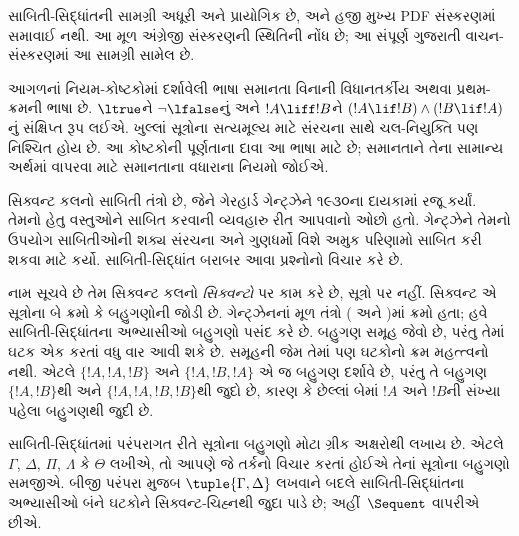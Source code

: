 
\label{guunit:OLP-0685}


\begin{editorial}
  સાબિતી-સિદ્ધાંતની સામગ્રી અધૂરી અને પ્રાયોગિક છે,
  અને હજી મુખ્ય PDF સંસ્કરણમાં સમાવાઈ નથી.
  આ મૂળ અંગ્રેજી સંસ્કરણની સ્થિતિની નોંધ છે;
  આ સંપૂર્ણ ગુજરાતી વાચન-સંસ્કરણમાં આ સામગ્રી સામેલ છે.
\end{editorial}

\begingroup
\makeatletter{}\makeatother

\label{guunit:OLP-0712}


\begingroup
\makeatletter{}\makeatother


\label{guunit:OLP-0700}


આગળનાં નિયમ-કોષ્ટકોમાં દર્શાવેલી ભાષા
સમાનતા વિનાની વિધાનતર્કીય અથવા પ્રથમ-ક્રમની ભાષા છે.
$\ltrue$ને $\lnot\lfalse$નું અને
$!A \liff !B$ને $(!A \lif !B)\land(!B \lif !A)$નું
સંક્ષિપ્ત રૂપ લઈએ. ખુલ્લાં સૂત્રોના સત્યમૂલ્ય માટે
સંરચના સાથે ચલ-નિયુક્તિ પણ નિશ્ચિત હોય છે.
આ કોષ્ટકોની પૂર્ણતાના દાવા આ ભાષા માટે છે;
સમાનતાને તેના સામાન્ય અર્થમાં વાપરવા માટે
સમાનતાના વધારાના નિયમો જોઈએ.

સિક્વન્ટ કલનો સાબિતી તંત્રો છે,
જેને ગેરહાર્ડ ગેન્ટ્ઝેને ૧૯૩૦ના દાયકામાં રજૂ કર્યાં.
તેમનો હેતુ વસ્તુઓને સાબિત કરવાની વ્યવહારુ રીત આપવાનો ઓછો હતો.
ગેન્ટ્ઝેને તેમનો ઉપયોગ સાબિતીઓની શક્ય સંરચના
અને ગુણધર્મો વિશે અમુક પરિણામો સાબિત કરી શકવા માટે કર્યો.
સાબિતી-સિદ્ધાંત બરાબર આવા પ્રશ્નોનો વિચાર કરે છે.

નામ સૂચવે છે તેમ સિક્વન્ટ કલનો \emph{સિક્વન્ટો} પર કામ કરે છે,
સૂત્રો પર નહીં.
સિક્વન્ટ એ સૂત્રોના બે ક્રમો કે બહુગણોની જોડી છે.
ગેન્ટ્ઝેનનાં મૂળ તંત્રો ( અને )માં ક્રમો હતા;
હવે સાબિતી-સિદ્ધાંતના અભ્યાસીઓ બહુગણો પસંદ કરે છે.
બહુગણ સમૂહ જેવો છે, પરંતુ તેમાં ઘટક
એક કરતાં વધુ વાર આવી શકે છે.
સમૂહની જેમ તેમાં પણ ઘટકોનો ક્રમ મહત્ત્વનો નથી.
એટલે $\{!A, !A, !B\}$ અને $\{!A, !B, !A\}$
એ જ બહુગણ દર્શાવે છે,
પરંતુ તે બહુગણ $\{!A, !B\}$થી અને $\{!A, !A, !B, !B\}$થી જુદો છે,
કારણ કે છેલ્લાં બેમાં $!A$ અને $!B$ની સંખ્યા પહેલા બહુગણથી જુદી છે.

સાબિતી-સિદ્ધાંતમાં પરંપરાગત રીતે સૂત્રોના બહુગણો
મોટા ગ્રીક અક્ષરોથી લખાય છે.
એટલે $\Gamma$, $\Delta$, $\Pi$, $\Lambda$ કે $\Theta$ લખીએ,
તો આપણે જે તર્કનો વિચાર કરતાં હોઈએ તેનાં સૂત્રોના બહુગણો સમજીએ.
બીજી પરંપરા મુજબ $\tuple{\Gamma, \Delta}$ લખવાને બદલે
સાબિતી-સિદ્ધાંતના અભ્યાસીઓ બંને ઘટકોને સિક્વન્ટ-ચિહ્નથી જુદા પાડે છે;
અહીં~$\Sequent$ વાપરીએ છીએ.

